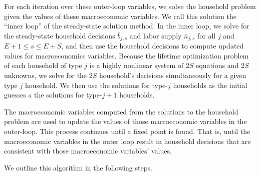  For each iteration over these outer-loop variables, we solve the household problem given the values of these macroeconomic variables.  We call this solution the ``inner loop'' of the steady-state solution method.  In the inner loop, we solve for the steady-state household decisions $\bar{b}_{j,s}$ and labor supply $\bar{n}_{j,s}$ for all $j$ and $E+1\leq s\leq E+S$, and then use the household decisions to compute updated values for macroeconomics variables. Because the lifetime optimization problem of each household of type $j$ is a highly nonlinear system of $2S$ equations and $2S$ unknowns, we solve for the $2S$ household's decisions simultaneously for a given type $j$ household.  We then use the solutions for type-$j$ households as the initial guesses a the solutions for type-$j+1$ households.

  The macroeconomic variables computed from the solutions to the household problem are used to update the values of those macroeconomic variables in the outer-loop.  This process continues until a fixed point is found.  That is, until the macroeconomic variables in the outer loop result in household decisions that are consistent with those macroeconomic variables' values.

 We outline this algorithm in the following steps.

